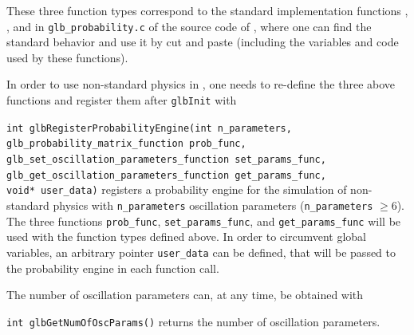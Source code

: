 These three function types correspond to the standard implementation functions , , and  in {\tt glb\_probability.c} of the source code of \GLOBES , where one can find the standard behavior and use it by cut and paste (including the variables and code used by these functions).

In order to use non-standard physics in \GLOBES , one needs to re-define the three above functions and register them after {\tt glbInit} with
\begin{function}
{\tt int glbRegisterProbabilityEngine(int n\_parameters,
                 glb\_probability\_matrix\_function prob\_func, \\
                 glb\_set\_oscillation\_parameters\_function set\_params\_func, \\
                 glb\_get\_oscillation\_parameters\_function get\_params\_func, \\
                 void* user\_data)} registers a probability
engine for the simulation of non-standard physics with {\tt n\_parameters} oscillation parameters ({\tt n\_parameters} $\ge6$). The three functions {\tt prob\_func}, {\tt set\_params\_func}, and {\tt get\_params\_func} 
will be used with the function types defined above. In order to circumvent global variables, an arbitrary pointer {\tt user\_data} can be defined, that will be passed to the probability engine in each function call.
\end{function}
The number of oscillation parameters can, at any time, be obtained with
\begin{function}
{\tt  int glbGetNumOfOscParams()} returns the number of oscillation parameters.
\end{function}

